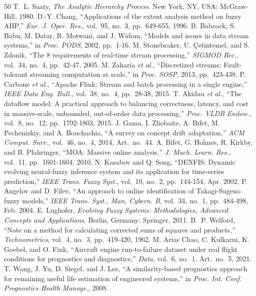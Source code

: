\documentclass[journal,10pt,twocolumn]{IEEEtran}
\begin{document}
\begin{thebibliography}{50}
T.~L. Saaty, \emph{The Analytic Hierarchy Process}. New York, NY, USA: McGraw-Hill, 1980.
D.-Y. Chang, ``Applications of the extent analysis method on fuzzy AHP,'' \emph{Eur. J. Oper. Res.}, vol.\ 95, no.\ 3, pp.\ 649-655, 1996.
B. Babcock, S. Babu, M. Datar, R. Motwani, and J. Widom, ``Models and issues in data stream systems,'' in \emph{Proc. PODS}, 2002, pp.\ 1-16.
M. Stonebraker, U. \c{C}etintemel, and S. Zdonik, ``The 8 requirements of real-time stream processing,'' \emph{SIGMOD Rec.}, vol.\ 34, no.\ 4, pp.\ 42-47, 2005.
M. Zaharia \emph{et al.}, ``Discretized streams: Fault-tolerant streaming computation at scale,'' in \emph{Proc. SOSP}, 2013, pp.\ 423-438.
P. Carbone \emph{et al.}, ``Apache Flink: Stream and batch processing in a single engine,'' \emph{IEEE Data Eng. Bull.}, vol.\ 38, no.\ 4, pp.\ 28-38, 2015.
T. Akidau \emph{et al.}, ``The dataflow model: A practical approach to balancing correctness, latency, and cost in massive-scale, unbounded, out-of-order data processing,'' \emph{Proc. VLDB Endow.}, vol.\ 8, no.\ 12, pp.\ 1792-1803, 2015.
J. Gama, I. Zliobaite, A. Bifet, M. Pechenizkiy, and A. Bouchachia, ``A survey on concept drift adaptation,'' \emph{ACM Comput. Surv.}, vol.\ 46, no.\ 4, 2014, Art.\ no.\ 44.
A. Bifet, G. Holmes, R. Kirkby, and B. Pfahringer, ``MOA: Massive online analysis,'' \emph{J. Mach. Learn. Res.}, vol.\ 11, pp.\ 1601-1604, 2010.
N. Kasabov and Q. Song, ``DENFIS: Dynamic evolving neural-fuzzy inference system and its application for time-series prediction,'' \emph{IEEE Trans. Fuzzy Syst.}, vol.\ 10, no.\ 2, pp.\ 144-154, Apr. 2002.
P. Angelov and D. Filev, ``An approach to online identification of Takagi-Sugeno fuzzy models,'' \emph{IEEE Trans. Syst., Man, Cybern. B}, vol.\ 34, no.\ 1, pp.\ 484-498, Feb. 2004.
E. Lughofer, \emph{Evolving Fuzzy Systems: Methodologies, Advanced Concepts and Applications}. Berlin, Germany: Springer, 2011.
B.~P. Welford, ``Note on a method for calculating corrected sums of squares and products,'' \emph{Technometrics}, vol.\ 4, no.\ 3, pp.\ 419-420, 1962.
M. Arias Chao, C. Kulkarni, K. Goebel, and O. Fink, ``Aircraft engine run-to-failure dataset under real flight conditions for prognostics and diagnostics,'' \emph{Data}, vol.\ 6, no.\ 1, Art.\ no.\ 5, 2021.
T. Wang, J. Yu, D. Siegel, and J. Lee, ``A similarity-based prognostics approach for remaining useful life estimation of engineered systems,'' in \emph{Proc. Int. Conf. Prognostics Health Manage.}, 2008.

\end{thebibliography}
\end{document}
